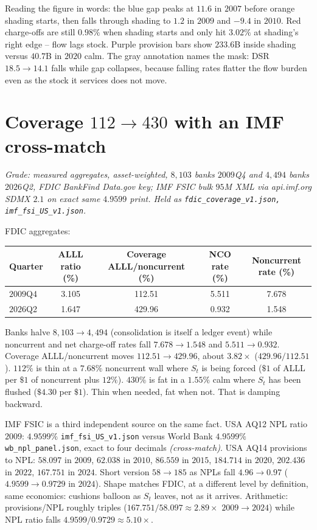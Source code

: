 Reading the figure in words: the blue gap peaks at $11.6$ in $2007$ before orange shading starts, then falls through shading to $1.2$ in $2009$ and $-9.4$ in $2010$. Red charge-offs are still $0.98\%$ when shading starts and only hit $3.02\%$ at shading's right edge -- flow lags stock. Purple provision bars show $233.6$B inside shading versus $40.7$B in $2020$ calm. The gray annotation names the mask: DSR $18.5\to14.1$ falls while gap collapses, because falling rates flatter the flow burden even as the stock it services does not move.

\section{Coverage $112\to430$ with an IMF cross-match}
\label{sec:fdic-imf}

\textit{Grade: measured aggregates, asset-weighted, $8{,}103$ banks $2009$Q4 and $4{,}494$ banks $2026$Q2, FDIC BankFind Data.gov key; IMF FSIC bulk $95$M XML via api.imf.org SDMX $2.1$ on exact same $4.9599$ print. Held as \texttt{fdic\_coverage\_v1.json, imf\_fsi\_US\_v1.json}.}

FDIC aggregates:

\begin{center}
\small
\begin{tabular}{lcccc}
\toprule
Quarter & ALLL ratio (\%) & Coverage ALLL/noncurrent (\%) & NCO rate (\%) & Noncurrent rate (\%) \\
\midrule
$2009$Q4 & 3.105 & 112.51 & 5.511 & 7.678 \\
$2026$Q2 & 1.647 & 429.96 & 0.932 & 1.548 \\
\bottomrule
\end{tabular}
\end{center}

Banks halve $8{,}103\to4{,}494$ (consolidation is itself a ledger event) while noncurrent and net charge-off rates fall $7.678\to1.548$ and $5.511\to0.932$. Coverage ALLL/noncurrent moves $112.51\to429.96$, about $3.82\times$ ($429.96/112.51$). $112\%$ is thin at a $7.68\%$ noncurrent wall where $S_t$ is being forced ($\$1$ of ALLL per $\$1$ of noncurrent plus $12\%$). $430\%$ is fat in a $1.55\%$ calm where $S_t$ has been flushed ($\$4.30$ per $\$1$). Thin when needed, fat when not. That is damping backward.

IMF FSIC is a third independent source on the same fact. USA AQ12 NPL ratio $2009$: $4.9599\%$ \texttt{imf\_fsi\_US\_v1.json} versus World Bank $4.9599\%$ \texttt{wb\_npl\_panel.json}, exact to four decimals \textit{(cross-match)}. USA AQ14 provisions to NPL: $58.097$ in $2009$, $62.038$ in $2010$, $86.559$ in $2015$, $184.714$ in $2020$, $202.436$ in $2022$, $167.751$ in $2024$. Short version $58\to185$ as NPLs fall $4.96\to0.97$ ($4.9599\to0.9729$ in $2024$). Shape matches FDIC, at a different level by definition, same economics: cushions balloon as $S_t$ leaves, not as it arrives. Arithmetic: provisions/NPL roughly triples ($167.751/58.097\approx2.89\times$ $2009\to2024$) while NPL ratio falls $4.9599/0.9729\approx5.10\times$.


